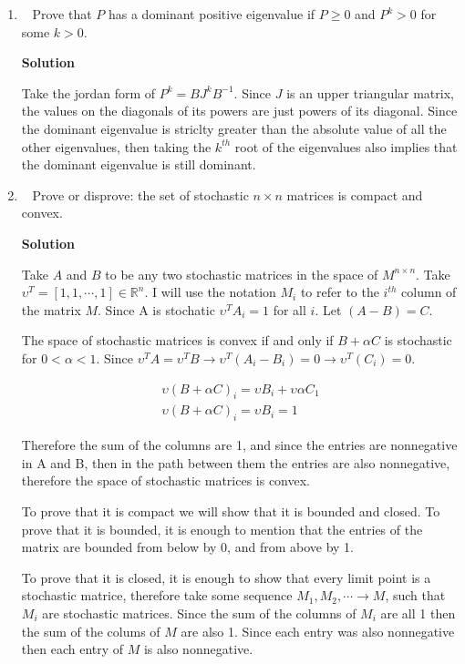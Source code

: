 \documentclass[11pt]{article}
\newcommand\score[1]{\marginpar{\vspace{-2ex}\color{blue}{#1/3}}\hspace{-1ex}}
\newcommand\0{\mathbf{0}}
\newcommand\RR{\mathbb{R}}
\newcommand\<{\langle}
\renewcommand\>{\rangle}
\begin{document}
\begin{enumerate}
\item\ \score{}%
Prove that $P$ has a dominant positive eigenvalue if $P \geq 0$ and
$P^k > 0$ for some $k > 0$.

\textbf{Solution}

Take the jordan form of $P^{k}=BJ^{k}B^{-1}$. Since $J$ is an upper triangular matrix, 
the values on the diagonals of its powers are just powers of its diagonal. Since the
dominant eigenvalue is striclty greater than the absolute value of all the other eigenvalues, then taking 
the $k^{th}$ root of the eigenvalues also implies that the dominant eigenvalue is still dominant. 

\item\ \score{}%
Prove or disprove: the set of stochastic $n \times n$ matrices is
compact and convex.

\textbf{Solution}

Take $A$ and $B$ to be any two stochastic matrices in the space of $M^{n\times n}$.
Take $\upsilon^{T} = [1,1,\cdots , 1] \in \RR^{n}$. I will use the notation $M_{i}$ to 
refer to the $i^{th}$ column of the matrix $M$. Since A is stochatic $\upsilon^{T}A_{i}=1$ for all $i$. Let $(A-B)=C$.

The space of stochastic matrices is convex if and only if $B+\alpha C$ is stochastic 
for $0 < \alpha < 1$. Since $\upsilon^{T} A = \upsilon^{T} B \rightarrow \upsilon^{T}(A_{i}-B_{i})=0 \rightarrow \upsilon^{T}(C_{i})=0$.

\begin{align*}
  \upsilon(B+\alpha C)_{i}=\upsilon B_{i}+\upsilon \alpha C_{1}\\
  \upsilon(B+\alpha C)_{i}=\upsilon B_{i}=1
\end{align*}

Therefore the sum of the columns are 1, and since the entries are nonnegative in A and B, then
in the path between them the entries are also nonnegative, therefore the space of stochastic matrices
is convex. 

To prove that it is compact we will show that it is bounded and closed. To prove that it 
is bounded, it is enough to mention that the entries of the matrix are bounded 
from below by 0, and from above by 1.

To prove that it is closed, it is enough to show that every limit point is a stochastic matrice, therefore take some sequence 
$M_{1},M_{2}, \cdots \rightarrow M$, such that $M_{i}$ are stochastic matrices.
Since the sum of the columns of $M_{i}$ are all 1 then the sum of the colums of $M$ are also 1. 
Since each entry was also nonnegative then each entry of $M$ is also nonnegative.


\end{enumerate}
\end{document}
